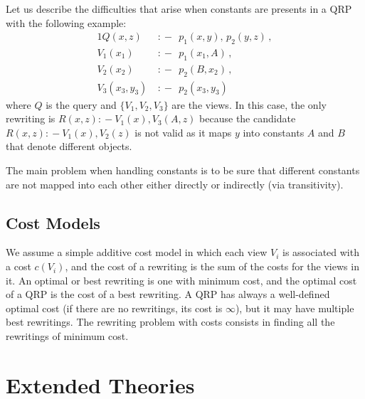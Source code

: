 \documentclass{sig-alternate}
\newcommand{\qrule}{:\!\!-}
\begin{document}
Let us describe the difficulties that arise when constants
are presents in a QRP with the following example:
\begin{alignat*}{1}
Q(x,z)\ &\qrule\ \ p_1(x,y),\, p_2(y,z)\,, \\
V_1(x_1)\ &\qrule\ \ p_1(x_1,A)\,, \\
V_2(x_2)\ &\qrule\ \ p_2(B,x_2)\,, \\
V_3(x_3,y_3)\ &\qrule\ \ p_2(x_3,y_3)
\end{alignat*}
where $Q$ is the query and $\{V_1,V_2,V_3\}$ are the 
views. In this case, the only rewriting is 
$R(x,z)\qrule V_1(x),V_3(A,z)$ because the candidate 
$R(x,z)\qrule V_1(x),V_2(z)$ is not valid as it maps
$y$ into constants $A$ and $B$ that denote different
objects.

The main problem when handling constants is to
be sure that different constants are not mapped into
each other either directly or indirectly (via transitivity).

\subsection{Cost Models}

We assume a simple additive cost model in which each view
$V_i$ is associated with a cost $c(V_i)$, and the cost of
a rewriting is the sum of the costs for the views in it.
An optimal or best rewriting is one with minimum cost,
and the optimal cost of a QRP is the cost of a best
rewriting. A QRP has always a well-defined optimal
cost (if there are no rewritings, its cost is $\infty$),
but it may have multiple best rewritings.
The rewriting problem with costs consists in finding
all the rewritings of minimum cost.



\section{Extended Theories}
\end{document}
